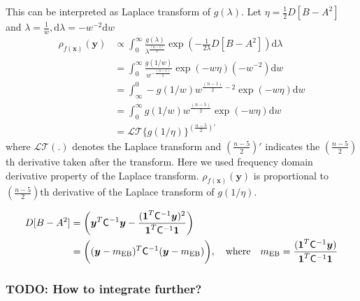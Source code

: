 \documentclass{svjour3}                     %
\newcommand{\bm}[1]{\boldsymbol{#1}}
\newcommand{\dif}[1]{\text{d}{#1}}
\newcommand{\vx}{\bm{x}}
\newcommand{\vy}{\bm{y}}
\newcommand{\vone}{\bm{1}}
\newcommand{\mCInv}{\mathsf{C}^{-1}}
\newcommand{\MLE}{\textup{EB}}
\begin{document}
This can be interpreted as Laplace transform of $g(\lambda)$.
Let $\eta = \frac{1}{2} D [B - A^2] $ and $\lambda = \frac{1}{w}, \dif{\lambda} = -w^{-2} \dif{w}$ 
\begin{align*}
\rho_{f(\vx)}(\vy) 
& \propto \int_{0}^\infty \frac{g(\lambda)}{\lambda^{\frac{(n-1)}{2}}}
\exp \left(  - \frac{1}{2\lambda} D [B - A^2] \right)
\dif{\lambda} 
\\
&= \int_{0}^\infty \frac{g(1/w)  }{w^{-\frac{(n-1)}{2}}}
\exp \left(  - w \eta \right)
(-w^{-2})\dif{w}
\\
&= \int_\infty^0 -g(1/w) w^{\frac{(n-1)}{2} - 2}
\exp \left(  - w \eta \right)
\dif{w}
\\
&= \int_{0}^\infty g(1/w) w^{\frac{(n-5)}{2}}
\exp \left(  - w \eta \right)
\dif{w}
\\
& = \mathcal{LT}\{ g(1/\eta) \}^{(\frac{n-5}{2})'}
\end{align*}
where $\mathcal{LT}(.)$ denotes the Laplace transform and $(\frac{n-5}2)'$ indicates the $(\frac{n-5}2)$th derivative taken after the transform.
Here we used frequency domain derivative property of the Laplace transform. 
$\rho_{f(\vx)}(\vy)$  is proportional to $(\frac{n-5}2)$th derivative of the Laplace transform of $g(1/\eta)$.

\begin{align*}
D [B - A^2] &= \left(\vy^T\mCInv\vy - \frac{(\vone^T\mCInv\vy)^2}{\vone^T\mCInv\vone} \right)
\\
&= \biggl((\vy-m_\MLE)^T \mCInv (\vy-m_\MLE) \biggr), 
\quad \text{where} \quad
m_\MLE=\frac{(\vone^T \mCInv \vy)}{\vone^T\mCInv\vone}
\end{align*}
\subsubsection{TODO: How to integrate further?}



\fi
















\pagebreak

\end{document}
